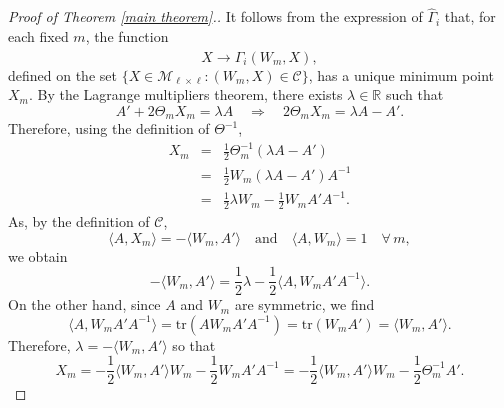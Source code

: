 \documentclass[12pt]{amsart}
\newcommand{\R}{\mathbb R}
\newcommand{\1}{\mathbf 1}
\newcommand{\M}{{\mathcal M}}
\begin{document}
\begin{proof}[Proof of Theorem \ref{main theorem}.]
It follows from the expression of $\hat \Gamma_i$ that, for each fixed $m$, the function
$$
X\rightarrow\hat \Gamma_i (W_m,X),
$$
defined on the set $\{X\in\M_{\ell\times\ell}\colon (W_m,X)\in \mathcal{C}\}$, 
has a unique minimum point $X_m$. 
By the Lagrange multipliers theorem, there exists $\lambda\in\R$ such that
$$
A'+2\Theta_m X_m=\lambda A\quad\Rightarrow\quad2\Theta_m X_m=\lambda A-A'.
$$
Therefore, using the definition of $\Theta^{-1}$,
\begin{eqnarray*}
X_m&=&\frac12\Theta_m^{-1}(\lambda A-A')\\
&=&\frac12W_m(\lambda A-A')A^{-1}\\
&=&\frac12\lambda W_m-\frac12W_mA'A^{-1}.
\end{eqnarray*}
As, by the definition of $\mathcal{C}$,
$$
\langle A,X_m\rangle=-\langle W_m,A'\rangle\quad\mbox{and}\quad\langle A,W_m\rangle =1\quad\forall\, m,
$$
we obtain
$$
-\langle W_m,A'\rangle=\frac12\lambda-\frac12\langle A,W_mA'A^{-1}\rangle.
$$
On the other hand, since $A$ and $W_m$ are symmetric, we find
$$
\langle A,W_mA'A^{-1}\rangle=\mbox{tr}(AW_mA'A^{-1})=\mbox{tr}(W_m A')=\langle W_m,A'\rangle.
$$
Therefore, $\lambda=-\langle W_m,A'\rangle$ so that
$$
X_m=-\frac12\langle W_m, A'\rangle W_m-\frac12W_mA'A^{-1}=-\frac12\langle W_m, A'\rangle W_m-\frac12\Theta_m^{-1}A'.
$$%




\end{proof}
\end{document}
